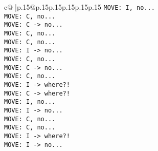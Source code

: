 \documentclass{article}
\begin{document}
{\begin{supertabular}{c@{$\;$}|p{.15\linewidth}@{}p{.15\linewidth}p{.15\linewidth}p{.15\linewidth}p{.15\linewidth}p{.15\linewidth}}
{{{ \tt  MOVE: I, no...\\ \tt  MOVE: C, no...\\ \tt  MOVE: C -> no...\\ \tt  MOVE: C, no...\\ \tt  MOVE: C, no...\\ \tt  MOVE: I -> no...\\ \tt  MOVE: C, no...\\ \tt  MOVE: C -> no...\\ \tt  MOVE: C, no...\\ \tt  MOVE: I -> where?!\\ \tt  MOVE: C -> where?!\\ \tt  MOVE: I, no...\\ \tt  MOVE: I -> no...\\ \tt  MOVE: C, no...\\ \tt  MOVE: C, no...\\ \tt  MOVE: I -> where?!\\ \tt  MOVE: I -> no...\\ \tt }}}
\end{supertabular}}
\end{document}
